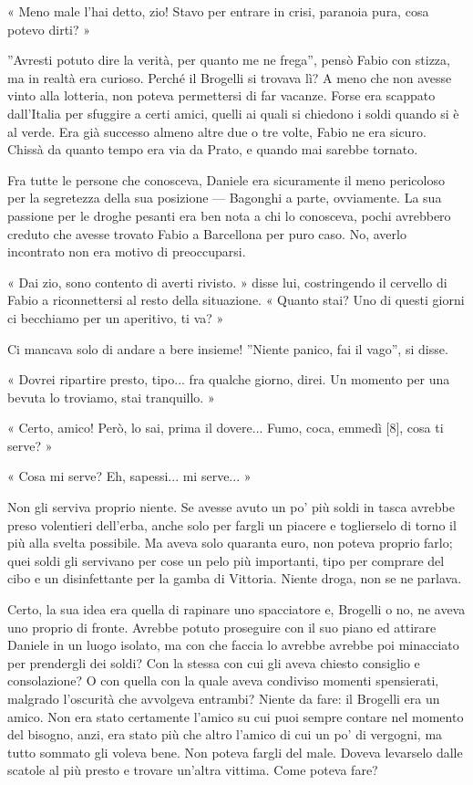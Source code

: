 « Meno male l'hai detto, zio! Stavo per entrare in crisi, paranoia pura, cosa potevo dirti? »

''Avresti potuto dire la verità, per quanto me ne frega'', pensò Fabio con stizza, ma in realtà era curioso. Perché il Brogelli si trovava lì? A meno che non avesse vinto alla lotteria, non poteva permettersi di far vacanze. Forse era scappato dall'Italia per sfuggire a certi amici, quelli ai quali si chiedono i soldi quando si è al verde. Era già successo almeno altre due o tre volte, Fabio ne era sicuro. Chissà da quanto tempo era via da Prato, e quando mai sarebbe tornato.

Fra tutte le persone che conosceva, Daniele era sicuramente il meno pericoloso per la segretezza della sua posizione --- Bagonghi a parte, ovviamente. La sua passione per le droghe pesanti era ben nota a chi lo conosceva, pochi avrebbero creduto che avesse trovato Fabio a Barcellona per puro caso. No, averlo incontrato non era motivo di preoccuparsi.

« Dai zio, sono contento di averti rivisto. » disse lui, costringendo il cervello di Fabio a riconnettersi al resto della situazione. « Quanto stai? Uno di questi giorni ci becchiamo per un aperitivo, ti va? »

Ci mancava solo di andare a bere insieme! ''Niente panico, fai il vago'', si disse.

« Dovrei ripartire presto, tipo... fra qualche giorno, direi. Un momento per una bevuta lo troviamo, stai tranquillo. »

« Certo, amico! Però, lo sai, prima il dovere... Fumo, coca, emmedì [8], cosa ti serve? »

« Cosa mi serve? Eh, sapessi... mi serve... »

Non gli serviva proprio niente. Se avesse avuto un po' più soldi in tasca avrebbe preso volentieri dell'erba, anche solo per fargli un piacere e toglierselo di torno il più alla svelta possibile. Ma aveva solo quaranta euro, non poteva proprio farlo; quei soldi gli servivano per cose un pelo più importanti, tipo per comprare del cibo e un disinfettante per la gamba di Vittoria. Niente droga, non se ne parlava.

Certo, la sua idea era quella di rapinare uno spacciatore e, Brogelli o no, ne aveva uno proprio di fronte. Avrebbe potuto proseguire con il suo piano ed attirare Daniele in un luogo isolato, ma con che faccia lo avrebbe avrebbe poi minacciato per prendergli dei soldi? Con la stessa con cui gli aveva chiesto consiglio e consolazione? O con quella con la quale aveva condiviso momenti spensierati, malgrado l'oscurità che avvolgeva entrambi? Niente da fare: il Brogelli era un amico. Non era stato certamente l'amico su cui puoi sempre contare nel momento del bisogno, anzi, era stato più che altro l'amico di cui un po' di vergogni, ma tutto sommato gli voleva bene. Non poteva fargli del male. Doveva levarselo dalle scatole al più presto e trovare un'altra vittima. Come poteva fare?

